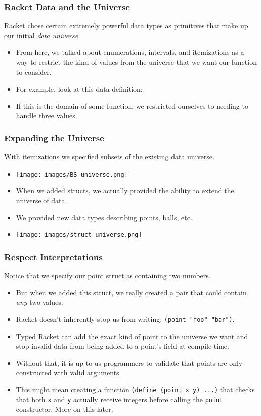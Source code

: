 \documentclass{beamer}
\begin{document}

\begin{frame}
  \frametitle{Racket Data and the Universe}
  Racket chose certain extremely powerful data types as primitives
  that make up our initial \emph{data universe}.
  \begin{itemize}
  \item<2-> From here, we talked about enumerations, intervals,
    and itemizations as a way to restrict the kind of values from
    the universe that we want our function to consider.
  \item<3-> For example, look at this data definition:
    \BSData
  \item<4-> If this is the domain of some function, we restricted
    ourselves to needing to handle three values.  
  \end{itemize}
\end{frame}

\begin{frame}
  \frametitle{Expanding the Universe}
With itemizations we specified subsets of the existing data universe.
\begin{itemize}
  \item<1-> \texttt{[image: images/BS-universe.png]}    
  \item<2-> When we added structs, we actually provided the ability to
  extend the universe of data.
  \item<3-> We provided new data types describing points, balls, etc.
  \item<4-> \texttt{[image: images/struct-universe.png]}
  \end{itemize}
\end{frame}

\begin{frame}
  \frametitle{Respect Interpretations}
  Notice that we specify our point struct as containing
  two numbers.
  \begin{itemize}
  \item<2-> But when we added this struct, we really created a pair
    that could contain \emph{any} two values.
  \item<3-> Racket doesn't inherently stop us from writing:
    \texttt{(point "foo" "bar")}.
  \item<4-> Typed Racket can add the exact kind of point to the universe we want and stop invalid data from being added to a point's
    field at compile time.
  \item<5-> Without that, it is up to us programmers to validate
    that points are only constructed with valid arguments.
  \item<6-> This might mean creating a function \texttt{(define (point x y) ...)} that checks
    that both \texttt{x} and \texttt{y} actually receive integers before calling the \texttt{point} constructor. More on this later.
  \end{itemize}
\end{frame}
\end{document}

